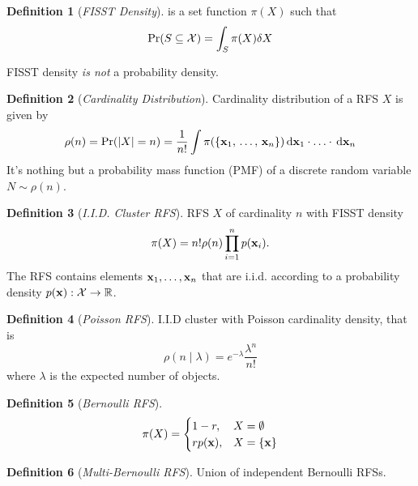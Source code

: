 \documentclass[a4paper,10pt]{scrreprt}
\theoremstyle{theorem}
\theoremstyle{definition}
\newtheorem{defn}{Definition}
\begin{document}
\begin{defn}[\emph{FISST Density}]
	 is a set function \( \pi(X) \) such that 
	\begin{equation}\label{eq:fiist_density}
		\Pr(S \subseteq \mathcal{X}) = \int_S \pi(X) \dsx[X]
	\end{equation}
\end{defn}
FISST density \emph{is not} a probability density.

\begin{defn}[\emph{Cardinality Distribution}]
	Cardinality distribution of a RFS \( X \) is given by
	\begin{equation}\label{key}
		\rho(n) = \Pr(|X|=n) = \frac{1}{n!}\int \pi(\Bqty{\stVar_1,\, \ldots,\, \stVar_n}) \dx[\stVar_1]\cdot\ldots\cdot\dx[\stVar_n]
	\end{equation}
	It's nothing but a probability mass function (PMF) of a discrete random variable \( N \sim \rho(n) \).
\end{defn}

\begin{defn}[\emph{I.I.D. Cluster RFS}]
	RFS \( X \) of cardinality \( n \) with FISST density
	\begin{equation}\label{key}
		\pi(X) = n! \rho(n) \prod_{i=1}^{n} p(\stVar_i).
	\end{equation}
	The RFS contains elements \( \stVar_1, \ldots, \stVar_n \) that are i.i.d. according to a probability density \( p(\stVar): \stSp\to\R \).
\end{defn}

\begin{defn}[\emph{Poisson RFS}]
	I.I.D cluster with Poisson cardinality density, that is
	\begin{equation}\label{key}
		\rho(n \mid \lambda) = e^{-\lambda} \frac{\lambda^n}{n!}
	\end{equation}
	where \( \lambda \) is the expected number of objects.
\end{defn}

\begin{defn}[\emph{Bernoulli RFS}]
\begin{equation}\label{eq:bernoulli_rfs}
	\pi(X) = 
	\begin{cases}
	1 - r, 			& X = \emptyset \\
	r p(\stVar), 	& X = \Bqty{\stVar}
	\end{cases}
\end{equation}
\end{defn}

\begin{defn}[\emph{Multi-Bernoulli RFS}]
	Union of independent Bernoulli RFSs.
\end{defn}
\end{document}
